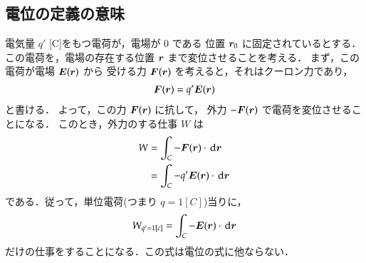         \subsection{電位の定義の意味}
            電気量 $q'$ [C]をもつ電荷が，電場が 0 である
            位置 $\boldsymbol{r}_{0}$ に固定されているとする．
            この電荷を，電場の存在する位置 $\boldsymbol{r}$ まで変位させることを考える．
            まず，この電荷が電場 $\boldsymbol{E}(\boldsymbol{r})$ から
            受ける力 $\boldsymbol{F}(\boldsymbol{r})$ を考えると，それはクーロン力であり，
            \begin{align}
                \boldsymbol{F}(\boldsymbol{r})=q'\boldsymbol{E}(\boldsymbol{r})
            \end{align}
            と書ける．
            よって，この力 $\boldsymbol{F}(\boldsymbol{r})$ に抗して，
            外力 $-\boldsymbol{F}(\boldsymbol{r})$ で電荷を変位させることになる．
            このとき，外力のする仕事 $W$ は
            \begin{align}
                W&=\int_{C} -\boldsymbol{F}(\boldsymbol{r}) \cdot \,\mathrm{d}\boldsymbol{r} \notag \\
                &=\int_{C} -q'\boldsymbol{E}(\boldsymbol{r}) \cdot \,\mathrm{d}\boldsymbol{r}
            \end{align}
            である．従って，単位電荷(つまり $q=1[C]$)当りに，
            \begin{align}
                W_{q'=1[c]}=\int_{C} -\boldsymbol{E}(\boldsymbol{r}) \cdot \,\mathrm{d}\boldsymbol{r}
            \end{align}
            だけの仕事をすることになる．この式は電位の式に他ならない．


